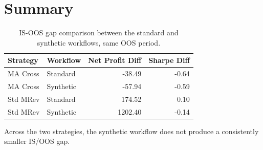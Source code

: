 \section{Summary}

\begin{table}[H]
    \centering
    \begin{tabular}{llrr}
        \toprule
        Strategy & Workflow & Net Profit Diff & Sharpe Diff \\
        \midrule
        MA Cross & Standard  & -38.49  & -0.64 \\
        MA Cross & Synthetic & -57.94  & -0.59 \\
        Std MRev & Standard  & 174.52  & 0.10 \\
        Std MRev & Synthetic & 1202.40 & -0.14 \\
        \bottomrule
    \end{tabular}
    \caption{IS-OOS gap comparison between the standard and synthetic workflows, same OOS period.}
    \label{tab:summary-gap}
\end{table}

Across the two strategies, the synthetic workflow does not produce a consistently smaller IS/OOS gap.
